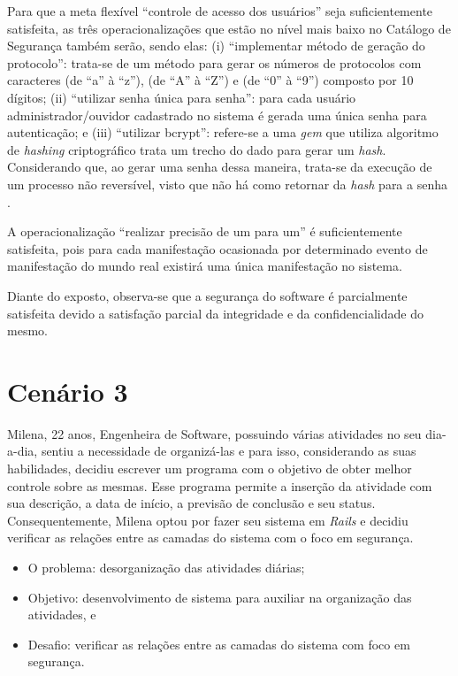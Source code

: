 Para que a meta flexível “controle de acesso dos usuários” seja suficientemente satisfeita, as três operacionalizações que estão no nível mais baixo no Catálogo de Segurança também serão, sendo elas: (i) “implementar método de geração do protocolo”: trata-se de um método para gerar os números de protocolos com caracteres (de “a” à “z”), (de “A” à “Z”) e (de “0” à “9”) composto por 10 dígitos; (ii) “utilizar senha única para senha”: para cada usuário administrador/ouvidor cadastrado no sistema é gerada uma única senha para autenticação; e (iii) “utilizar bcrypt”: refere-se a uma \textit{gem} que utiliza algoritmo de \textit{hashing} criptográfico trata um trecho do dado para gerar um \textit{hash}. Considerando que, ao gerar uma senha dessa maneira, trata-se da execução de um processo não reversível, visto que não há como retornar da \textit{hash} para a senha \cite{brcypt}.

A operacionalização “realizar precisão de um para um” é suficientemente satisfeita, pois para cada manifestação ocasionada por determinado evento de manifestação do mundo real existirá uma única manifestação no sistema.

Diante do exposto, observa-se que a segurança do software é parcialmente satisfeita devido a satisfação parcial da integridade e da confidencialidade do mesmo.

\section{Cenário 3}
\label{subsec:persona3}

Milena, 22 anos, Engenheira de Software, possuindo várias atividades no seu dia-a-dia, sentiu a necessidade de organizá-las e para isso, considerando as suas habilidades, decidiu escrever um programa com o objetivo de obter melhor controle sobre as mesmas. Esse programa permite a inserção da atividade com sua descrição, a data de início, a previsão de conclusão e seu status. Consequentemente, Milena optou por fazer seu sistema em \textit{Rails} e decidiu verificar as relações entre as camadas do sistema com o foco em segurança.

\begin{itemize}
	\item O problema: desorganização das atividades diárias;
	\item Objetivo: desenvolvimento de sistema para auxiliar na organização das atividades, e
	\item Desafio: verificar as relações entre as camadas do sistema com foco em segurança.
\end{itemize}

